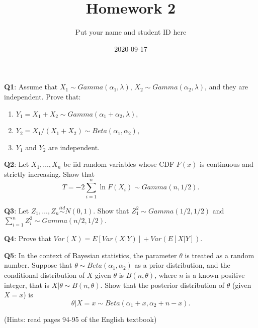 \documentclass[]{article}
\title{Homework 2}
\author{Put your name and student ID here}
\date{2020-09-17}
\begin{document}
\maketitle

\textbf{Q1}: Assume that \(X_1\sim Gamma(\alpha_1,\lambda)\),
\(X_2\sim Gamma(\alpha_2,\lambda)\), and they are independent. Prove
that:

\begin{enumerate}
\def\labelenumi{\arabic{enumi}.}
\item
  \(Y_1=X_1+X_2\sim Gamma(\alpha_1+\alpha_2,\lambda)\),
\item
  \(Y_2=X_1/(X_1+X_2)\sim Beta(\alpha_1,\alpha_2)\),
\item
  \(Y_1\) and \(Y_2\) are independent.
\end{enumerate}

\textbf{Q2}: Let \(X_1,\dots,X_n\) be iid random variables whose CDF
\(F(x)\) is continuous and strictly increasing. Show that
\[T=-2\sum_{i=1}^n \ln F(X_i)\sim Gamma(n,1/2).\]

\textbf{Q3}: Let \(Z_1,\dots,Z_n\stackrel{iid}{\sim}N(0,1)\). Show that
\(Z_1^2\sim Gamma(1/2,1/2)\) and
\(\sum_{i=1}^n Z_i^2\sim Gamma(n/2,1/2)\).

\textbf{Q4}: Prove that \(Var(X) = E[Var(X|Y)]+Var(E[X|Y])\).

\textbf{Q5}: In the context of Bayesian statistics, the parameter
\(\theta\) is treated as a random number. Suppose that
\(\theta \sim Beta(\alpha_1,\alpha_2)\) as a prior distribution, and the
conditional distribution of \(X\) given \(\theta\) is \(B(n,\theta)\),
where \(n\) is a known positive integer, that is
\(X|\theta\sim B(n,\theta)\). Show that the posterior distribution of
\(\theta\) (given \(X=x\)) is
\[\theta|X=x\sim Beta(\alpha_1+x,\alpha_2+n-x).\]

(Hints: read pages 94-95 of the English textbook)
\end{document}
